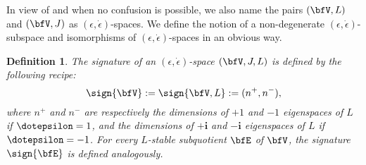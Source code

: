 \documentclass[12pt,a4paper]{amsart}
\numberwithin{equation}{section}
\newtheorem{defn}[thm]{Definition}
\theoremstyle{remark}
\begin{document}
In view of  and when no confusion is possible, we also name the pairs $(\bfV, L)$ and  $(\bfV, J)$ as $(\epsilon, \dot \epsilon)$-spaces.
We define the notion of a non-degenerate $(\epsilon, \dot \epsilon)$-subspace and isomorphisms of
$(\epsilon, \dot \epsilon)$-spaces in an obvious way.







\begin{defn}\label{def:Vsign}
  The signature of an $(\epsilon, \dot \epsilon)$-space $(\bfV,J,L)$  is defined
  by the following recipe: $$\sign{\bfV} := \sign{\bfV, L}:=(n^+,n^-),$$
   where $n^+$ and $n^-$ are
  respectively the dimensions of $+1$ and $-1$ eigenspaces of $L$ if
  $\dotepsilon=1$, and the dimensions of $+\mathbf i$ and $-\mathbf i$ eigenspaces of $L$ if
  $\dotepsilon=-1$.  For every
  $L$-stable subquotient $\bfE$ of $\bfV$, the signature $\sign{\bfE}$ is
  defined analogously.
 \end{defn}
\end{document}
